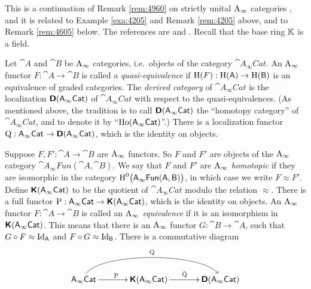 \begin{rem} \label{rem:4970}
This is a continuation of Remark \ref{rem:4960} on strictly unital 
$\mathrm{A}_{\infty}$ categories%
, 
and it is related to Example \ref{exa:4205} and Remark \ref{rem:4205}
above, and to Remark \ref{rem:4605} below. The references are \cite{Kel5} and 
\cite{COS}. Recall that the base ring $\mathbb{K}$ is a field. 

Let $\cat{A}$ and $\cat{B}$ be $\mathrm{A}_{\infty}$ categories,
i.e.\ objects of the category $\cat{A_{\infty}Cat}$. 
An $\mathrm{A}_{\infty}$ functor $F : \cat{A} \to \cat{B}$
is called a {\em quasi-equivalence} if 
$\operatorname{H}(F) : \operatorname{H}(\operatorname{\mathsf{A}}) \to \operatorname{H}(\operatorname{\mathsf{B}})$
is an equivalence of graded categories.
The {\em derived category} of $\cat{A_{\infty}Cat}$
is the localization $\boldsymbol{\mathsf{D}}(\operatorname{\mathsf{A_{\infty}Cat}})$ of $\cat{A_{\infty}Cat}$ 
with respect to the quasi-equivalences. 
(As mentioned above, the tradition is to call 
$\boldsymbol{\mathsf{D}}(\operatorname{\mathsf{A_{\infty}Cat}})$ the ``homotopy category'' of 
$\cat{A_{\infty}Cat}$, and to denote 
it by ``$\operatorname{Ho}(\operatorname{\mathsf{A_{\infty}Cat}})$''.)
There is a localization functor 
$\operatorname{Q} : \operatorname{\mathsf{A_{\infty}Cat}} \to \boldsymbol{\mathsf{D}}(\operatorname{\mathsf{A_{\infty}Cat}})$, 
which is the identity on objects. 

Suppose $F, F' : \cat{A} \to \cat{B}$ are $\mathrm{A}_{\infty}$ functors. So 
$F$ and $F'$ are objects of the $\mathrm{A}_{\infty}$ category 
$\cat{A_{\infty}Fun}(\cat{A}, \cat{B})$.
We say that $F$ and $F'$ are {\em $\mathrm{A}_{\infty}$ homotopic} if 
they are isomorphic in the category 
$\operatorname{H}^0 \bigl( \operatorname{\mathsf{A_{\infty}Fun}}(\operatorname{\mathsf{A}}, \operatorname{\mathsf{B}}) \bigr)$, 
in which case we write $F \approx F'$. 
Define $\boldsymbol{\mathsf{K}}(\operatorname{\mathsf{A_{\infty}Cat}})$
to be the quotient of $\cat{A_{\infty}Cat}$ modulo the relation $\approx$. 
There is a full functor 
$\operatorname{P} : \operatorname{\mathsf{A_{\infty}Cat}} \to \boldsymbol{\mathsf{K}}(\operatorname{\mathsf{A_{\infty}Cat}})$, 
which is the identity on objects. 
An $\mathrm{A}_{\infty}$ functor $F : \cat{A} \to \cat{B}$
is called an {\em $\mathrm{A}_{\infty}$ equivalence} if it is an isomorphism in 
$\boldsymbol{\mathsf{K}}(\operatorname{\mathsf{A_{\infty}Cat}})$. This means that there is  
an $\mathrm{A}_{\infty}$ functor $G : \cat{B} \to \cat{A}$, 
such that $G \circ F \approx \operatorname{Id}_{\operatorname{\mathsf{A}}}$ 
and $F \circ G \approx \operatorname{Id}_{\operatorname{\mathsf{B}}}$.
There is a commutative diagram 
\begin{equation} \label{eqn:4975}
\UseTips \xymatrix @C=8ex @R=6ex {
\cat{A_{\infty}Cat}
\ar[r]^{\opn{P}}
\ar@(u,u)[rr]^{\opn{Q}}
&
\dcat{K}(\cat{A_{\infty}Cat})
\ar[r]^{\bar{\opn{Q}}}
&
\dcat{D}(\cat{A_{\infty}Cat})
}
\end{equation}


\end{rem}
